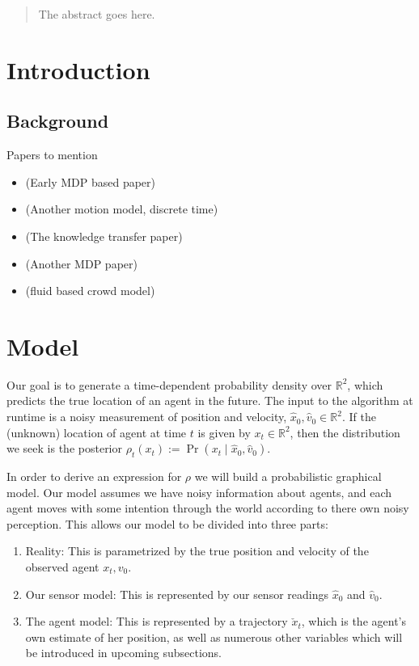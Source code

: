 \documentclass[conference]{IEEEtran}
\begin{document}
\begin{abstract}
The abstract goes here.
\end{abstract}

\IEEEpeerreviewmaketitle

\section{Introduction}


\subsection{Background}
Papers to mention
\begin{itemize}
	\item \citet{Kitani2012} (Early MDP based paper)
	\item \citet{Karasev2016} (Another motion model, discrete time)
	\item \citet{Ballan2016} (The knowledge transfer paper)
	\item \citet{Ziebart2009} (Another MDP paper)
	\item \citet{Helbing1992} (fluid based crowd model)
\end{itemize}

\section{Model}
Our goal is to generate a time-dependent probability density over $\mathbb{R}^2$, which predicts the true location of an agent in the future.
The input to the algorithm at runtime is a noisy measurement of position and velocity, $\hat{x}_0, \hat{v}_0 \in \mathbb{R}^2$.
If the (unknown) location of agent at time $t$ is given by $x_t \in \mathbb{R}^2$, then the distribution we seek is the posterior $\rho_t(x_t) := \Pr( x_t \mid \hat{x}_0, \hat{v}_0 )$.

In order to derive an expression for $\rho$ we will build a probabilistic graphical model.
Our model assumes we have noisy information about agents, and each agent moves with some intention through the world according to there own noisy perception.
This allows our model to be divided into three parts:
\begin{enumerate}
	\item Reality:  This is parametrized by the true position and velocity of the observed agent $x_t, v_0$.
	\item Our sensor model:  This is represented by our sensor readings $\hat{x}_0$ and $\hat{v}_0$.
	\item The agent model:  This is represented by a trajectory $\check{x}_t$, which is the agent's own estimate of her position, as well as numerous other variables which will be introduced in upcoming subsections.
\end{enumerate}
\end{document}
